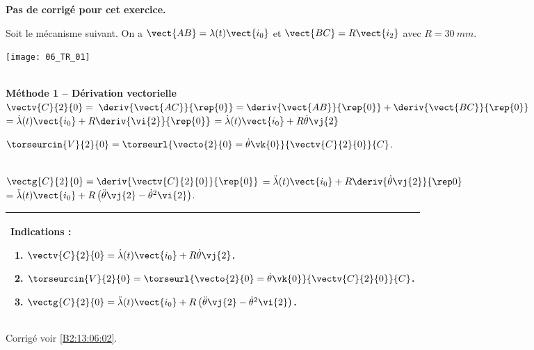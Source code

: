 \normaltrue
\correctiontrue


\setcounter{numques}{0}
\ifcorrection
\else
\textbf{Pas de corrigé pour cet exercice.}
\fi

\ifprof
\else
Soit le mécanisme suivant. On a $\vect{AB}=\lambda(t)\vect{i_0}$ et $\vect{BC}=R\vect{i_2}$ avec $R=\SI{30}{mm}$. 
\begin{center}
\texttt{[image: 06\_TR\_01]}
\end{center}
\fi

\ifprof ~\\

\textbf{Méthode 1 -- Dérivation vectorielle} ~\\

$\vectv{C}{2}{0} =$
$\deriv{\vect{AC}}{\rep{0}}= \deriv{\vect{AB}}{\rep{0}}+\deriv{\vect{BC}}{\rep{0}}$
$= \dot{\lambda}(t) \vect{i_0} + R \deriv{\vi{2}}{\rep{0}}$
$= \dot{\lambda}(t) \vect{i_0} + R \dot{\theta} \vj{2}$

\else
\fi

\ifprof

$\torseurcin{V}{2}{0}=\torseurl{\vecto{2}{0}=\dot{\theta}\vk{0}}{\vectv{C}{2}{0}}{C}$.

\else
\fi

\ifprof ~\\

$\vectg{C}{2}{0} =\deriv{\vectv{C}{2}{0}}{\rep{0}}$
$= \ddot{\lambda}(t) \vect{i_0} + R \deriv{\dot{\theta} \vj{2}}{\rep0}$
$= \ddot{\lambda}(t) \vect{i_0} + R \left(\ddot{\theta} \vj{2} - \dot{\theta}^2 \vi{2}\right) $.
\else
\fi


\ifprof
\else
\footnotesize
\begin{center}
\begin{tabular}{|p{.9\linewidth}|}
\hline
Indications :
\begin{enumerate}
\item $\vectv{C}{2}{0} =\dot{\lambda}(t) \vect{i_0} + R \dot{\theta} \vj{2}$.
\item $\torseurcin{V}{2}{0}=\torseurl{\vecto{2}{0}=\dot{\theta}\vk{0}}{\vectv{C}{2}{0}}{C}$.
\item $\vectg{C}{2}{0} =\ddot{\lambda}(t) \vect{i_0} + R \left(\ddot{\theta} \vj{2} - \dot{\theta}^2 \vi{2}\right) $.
\end{enumerate} \\ \hline
\end{tabular}
\end{center}
\normalsize
\begin{flushright}
\footnotesize{Corrigé  voir \ref{B2:13:06:02}.}
\end{flushright}%
\fi